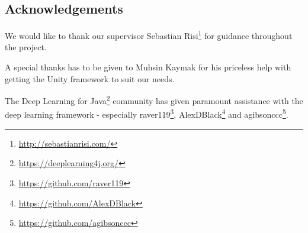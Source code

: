 
\begin{center}
\section*{Acknowledgements}
\vspace{1em}
\end{center}


\begin{addmargin}[4em]{4em}
\noindent
We would like to thank our supervisor Sebastian Risi\footnote{\url{http://sebastianrisi.com/}} for guidance throughout the project.

A special thanks has to be given to Muhsin Kaymak for his priceless help with getting the Unity framework to suit our needs.

The Deep Learning for Java\footnote{\url{https://deeplearning4j.org/}} community has given paramount assistance with the deep learning framework - especially raver119\footnote{\url{https://github.com/raver119}}, AlexDBlack\footnote{\url{https://github.com/AlexDBlack}} and agibsonccc\footnote{\url{https://github.com/agibsonccc}}.

\end{addmargin}








